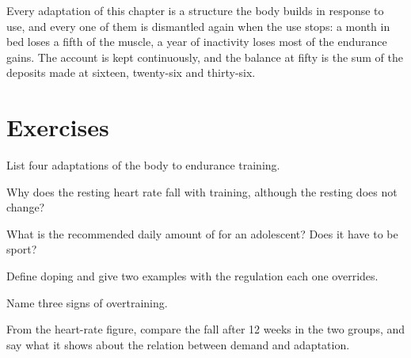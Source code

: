 \begin{remark}\label{rem:g10:sport-and-health:account}
Every adaptation of this chapter is a structure the body builds in
response to use, and every one of them is dismantled again when the
use stops: a month in bed loses a fifth of the muscle, a year of
inactivity loses most of the endurance gains. The account is kept
continuously, and the balance at fifty is the sum of the deposits
made at sixteen, twenty-six and thirty-six.
\end{remark}

\section{Exercises}

\begin{exercise}[$\star$]\label{exo:g10:sport-and-health:1}
List four adaptations of the body to endurance training.
\end{exercise}

\begin{exercise}[$\star$]\label{exo:g10:sport-and-health:2}
Why does the resting heart rate fall with training, although the
resting  does not change?
\end{exercise}

\begin{exercise}[$\star$]\label{exo:g10:sport-and-health:3}
What is the recommended daily amount of  for an
adolescent? Does it have to be sport?
\end{exercise}

\begin{exercise}[$\star$]\label{exo:g10:sport-and-health:4}
Define doping and give two examples with the regulation each one
overrides.
\end{exercise}

\begin{exercise}[$\star$]\label{exo:g10:sport-and-health:5}
Name three signs of overtraining.
\end{exercise}

\begin{exercise}[$\star\star$]\label{exo:g10:sport-and-health:6}
From the heart-rate figure, compare the fall after 12 weeks in the two
groups, and say what it shows about the relation between demand and
adaptation.
\end{exercise}

